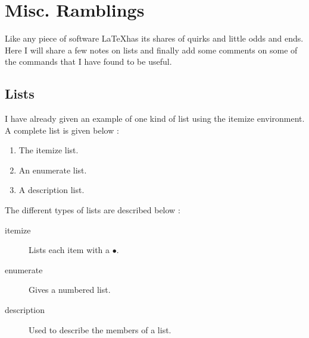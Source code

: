 \chapter{Misc. Ramblings}

Like any piece of software \LaTeX has its shares of quirks and little
odds and ends. Here I will share a few notes on lists and finally add
some comments on some of the commands that I have found to be useful.

\section{Lists}

I have already given an example of one kind of list using the
itemize environment.  A complete list is given below \cite{The-Manual}:
\begin{enumerate}
\item The itemize list.
\item An enumerate list.
\item A description list.
\end{enumerate}
The different types of lists are described below 
\cite[p. 65]{The-Manual}:
\begin{description}
\item[itemize]     Lists each item with a $\bullet$.
\item[enumerate]   Gives a numbered list.
\item[description] Used to describe the members of a list.
\end{description}


